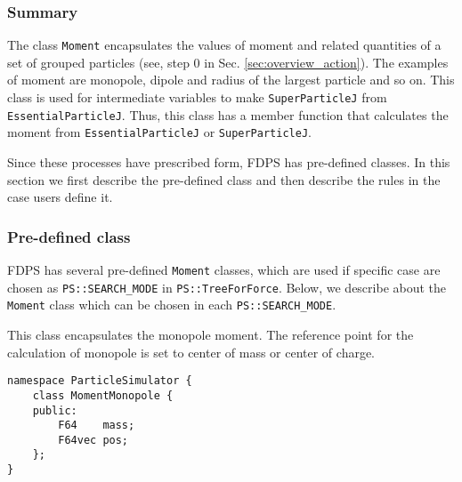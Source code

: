 \subsubsection{Summary}

The class \texttt{Moment} encapsulates the values of moment and related
quantities of a set of grouped particles
(see, step 0 in Sec. \ref{sec:overview_action}).
The examples of moment are monopole, dipole and radius of the largest
particle and so on. This class is used for intermediate variables to
make \texttt{SuperParticleJ} from \texttt{EssentialParticleJ}.
Thus, this class has a member function that calculates the moment from
\texttt{EssentialParticleJ} or \texttt{SuperParticleJ}.

Since these processes have prescribed form, FDPS has pre-defined classes.
In this section we first describe the pre-defined class and then describe
the rules in the case users define it.

\subsubsection{Pre-defined class}


FDPS has several pre-defined \texttt{Moment} classes, which are used if
specific case are chosen as \texttt{PS::SEARCH\_MODE} in \texttt{PS::TreeForForce}.
Below, we describe about the \texttt{Moment} class which can be chosen in each \texttt{PS::SEARCH\_MODE}.


\label{sec:MomentMonopole}

This class encapsulates the monopole moment.
The reference point for the calculation of monopole is set to center of mass or center of charge.

\begin{screen}
\begin{verbatim}
namespace ParticleSimulator {
    class MomentMonopole {
    public:
        F64    mass;
        F64vec pos;
    };
}
\end{verbatim}
\end{screen}

